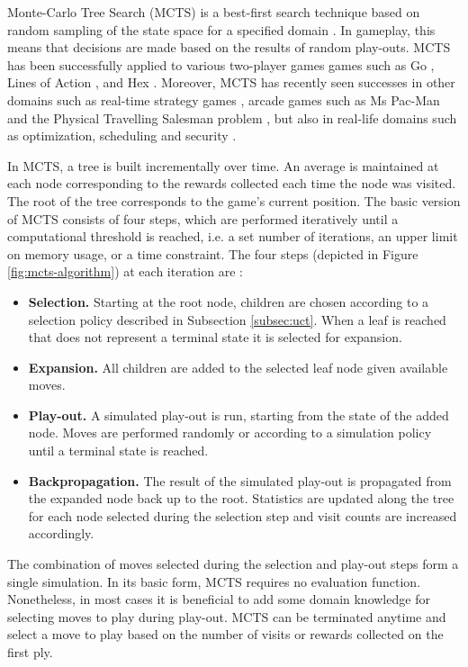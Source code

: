 \documentclass{ecai2014}
\begin{document}
Monte-Carlo Tree Search (MCTS) is a best-first search technique based on random sampling of the state space for a specified domain \cite{coulom2007efficient,kocsis2006bandit}. In gameplay, this means that decisions are made based on the results of random play-outs. MCTS has been successfully applied to various two-player games games such as Go \cite{lee2010current}, Lines of Action \cite{Winands2010b}, and Hex \cite{arneson2010monte}. Moreover, MCTS has recently seen successes in other domains such as real-time strategy games \cite{browne2012survey}, arcade games such as Ms Pac-Man \cite{enhancementspacmancig12} and the Physical Travelling Salesman problem \cite{powleytsp}, but also in real-life domains such as optimization, scheduling and security \cite{browne2012survey}.

In MCTS, a tree is built incrementally over time. An average is maintained at each node corresponding to the rewards collected each time the node was visited. The root of the tree corresponds to the game's current position. The basic version of MCTS consists of four steps, which are performed iteratively until a computational threshold is reached, i.e. a set number of iterations, an upper limit on memory usage, or a time constraint. The four steps (depicted in Figure \ref{fig:mcts-algorithm}) at each iteration are \cite{chaslot2008progressive}:
\begin{itemize}
\item {\bf Selection.} Starting at the root node, children are chosen according to a selection policy described in Subsection \ref{subsec:uct}. When a leaf is reached that does not represent a terminal state it is selected for expansion.
\item {\bf Expansion.} All children are added to the selected leaf node given available moves.
\item {\bf Play-out.} A simulated play-out is run, starting from the state of the added node. Moves are performed randomly or according to a simulation policy until a terminal state is reached.
\item {\bf Backpropagation.} The result of the simulated play-out is propagated from the expanded node back up to the root. Statistics are updated along the tree for each node selected during the selection step and visit counts are increased accordingly.
\end{itemize}
The combination of moves selected during the selection and play-out steps form a single simulation. In its basic form, MCTS requires no evaluation function. Nonetheless, in most cases it is beneficial to add some domain knowledge for selecting moves to play during play-out. MCTS can be terminated anytime and select a move to play based on the number of visits or rewards  collected on the first ply.
\end{document}
